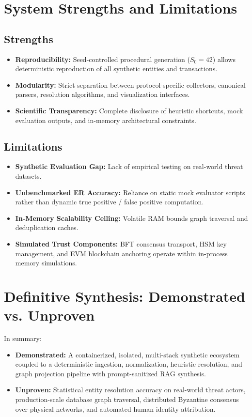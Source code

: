 \section{System Strengths and Limitations}
\label{sec:disc-strengths-limitations}

\subsection{Strengths}
\begin{itemize}
    \item \textbf{Reproducibility:} Seed-controlled procedural generation ($S_0 = 42$) allows deterministic reproduction of all synthetic entities and transactions.
    \item \textbf{Modularity:} Strict separation between protocol-specific collectors, canonical parsers, resolution algorithms, and visualization interfaces.
    \item \textbf{Scientific Transparency:} Complete disclosure of heuristic shortcuts, mock evaluation outputs, and in-memory architectural constraints.
\end{itemize}

\subsection{Limitations}
\begin{itemize}
    \item \textbf{Synthetic Evaluation Gap:} Lack of empirical testing on real-world threat datasets.
    \item \textbf{Unbenchmarked ER Accuracy:} Reliance on static mock evaluator scripts rather than dynamic true positive / false positive computation.
    \item \textbf{In-Memory Scalability Ceiling:} Volatile RAM bounds graph traversal and deduplication caches.
    \item \textbf{Simulated Trust Components:} BFT consensus transport, HSM key management, and EVM blockchain anchoring operate within in-process memory simulations.
\end{itemize}

\section{Definitive Synthesis: Demonstrated vs. Unproven}
\label{sec:disc-summary}
In summary:
\begin{itemize}
    \item \textbf{Demonstrated:} A containerized, isolated, multi-stack synthetic ecosystem coupled to a deterministic ingestion, normalization, heuristic resolution, and graph projection pipeline with prompt-sanitized RAG synthesis.
    \item \textbf{Unproven:} Statistical entity resolution accuracy on real-world threat actors, production-scale database graph traversal, distributed Byzantine consensus over physical networks, and automated human identity attribution.
\end{itemize}
